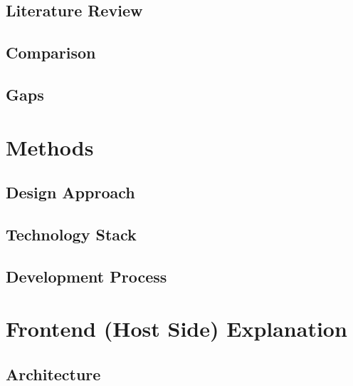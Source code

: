 \documentclass[12pt,oneside,a4paper]{article}
\begin{document}
\subsection{Literature Review}

\subsection{Comparison}

\subsection{Gaps}



\section{Methods} 

\subsection{Design Approach}

\subsection{Technology Stack}

\subsection{Development Process}


\section{Frontend (Host Side) Explanation} 

\subsection{Architecture}
\end{document}
